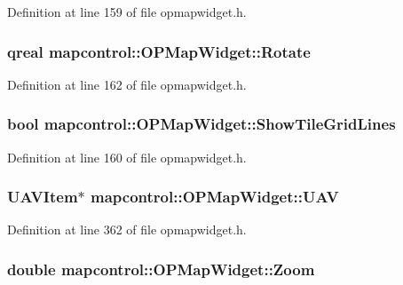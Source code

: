 \-Definition at line 159 of file opmapwidget.\-h.

\hypertarget{group___o_p_map_widget_gac0960d6e34ea06d84ddad72f930a3917}{
\subsubsection[{\-Rotate}]{\setlength{\rightskip}{0pt plus 5cm}qreal {\bf mapcontrol\-::\-O\-P\-Map\-Widget\-::\-Rotate}}}\label{group___o_p_map_widget_gac0960d6e34ea06d84ddad72f930a3917}


\-Definition at line 162 of file opmapwidget.\-h.

\hypertarget{group___o_p_map_widget_ga41a15a2c8198b2ad76d2b494917a02ed}{
\subsubsection[{\-Show\-Tile\-Grid\-Lines}]{\setlength{\rightskip}{0pt plus 5cm}bool {\bf mapcontrol\-::\-O\-P\-Map\-Widget\-::\-Show\-Tile\-Grid\-Lines}}}\label{group___o_p_map_widget_ga41a15a2c8198b2ad76d2b494917a02ed}


\-Definition at line 160 of file opmapwidget.\-h.

\hypertarget{group___o_p_map_widget_gabb5c6c7e07970a7f9b774ebf94cd2286}{
\subsubsection[{\-U\-A\-V}]{\setlength{\rightskip}{0pt plus 5cm}\-U\-A\-V\-Item$\ast$ {\bf mapcontrol\-::\-O\-P\-Map\-Widget\-::\-U\-A\-V}}}\label{group___o_p_map_widget_gabb5c6c7e07970a7f9b774ebf94cd2286}


\-Definition at line 362 of file opmapwidget.\-h.

\hypertarget{group___o_p_map_widget_gadc46820d44c2517e9a6014ddede98099}{
\subsubsection[{\-Zoom}]{\setlength{\rightskip}{0pt plus 5cm}double {\bf mapcontrol\-::\-O\-P\-Map\-Widget\-::\-Zoom}}}\label{group___o_p_map_widget_gadc46820d44c2517e9a6014ddede98099}


